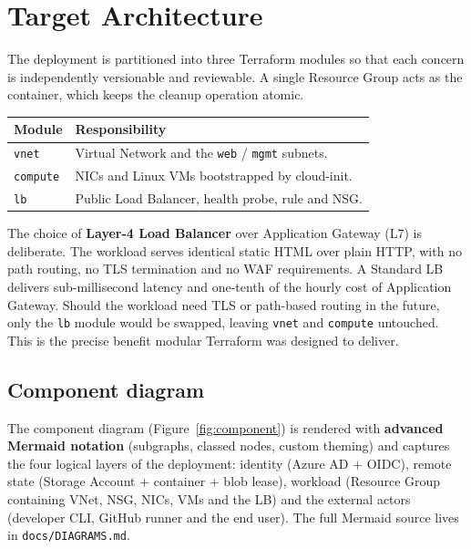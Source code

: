 \documentclass[10pt,a4paper,twocolumn]{article}
\begin{document}
\section{Target Architecture}

The deployment is partitioned into three Terraform modules so that each
concern is independently versionable and reviewable. A single Resource
Group acts as the container, which keeps the cleanup operation atomic.

\begin{center}
\small
\begin{tabular}{@{}ll@{}}
\toprule
\textbf{Module} & \textbf{Responsibility} \\
\midrule
\texttt{vnet}    & Virtual Network and the \texttt{web} / \texttt{mgmt} subnets. \\
\texttt{compute} & NICs and Linux VMs bootstrapped by cloud-init. \\
\texttt{lb}      & Public Load Balancer, health probe, rule and NSG. \\
\bottomrule
\end{tabular}
\end{center}

\begin{warningbox}
The choice of \textbf{Layer-4 Load Balancer} over Application Gateway
(L7) is deliberate. The workload serves identical static HTML over plain
HTTP, with no path routing, no TLS termination and no WAF requirements.
A Standard LB delivers sub-millisecond latency and one-tenth of the
hourly cost of Application Gateway. Should the workload need TLS or
path-based routing in the future, only the \texttt{lb} module would be
swapped, leaving \texttt{vnet} and \texttt{compute} untouched. This is
the precise benefit modular Terraform was designed to deliver.
\end{warningbox}

\subsection{Component diagram}

The component diagram (Figure~\ref{fig:component}) is rendered with
\textbf{advanced Mermaid notation} (subgraphs, classed nodes, custom
theming) and captures the four logical layers of the deployment:
identity (Azure AD + OIDC), remote state (Storage Account + container
+ blob lease), workload (Resource Group containing VNet, NSG, NICs,
VMs and the LB) and the external actors (developer CLI, GitHub runner
and the end user). The full Mermaid source lives in
\texttt{docs/DIAGRAMS.md}.
\end{document}
